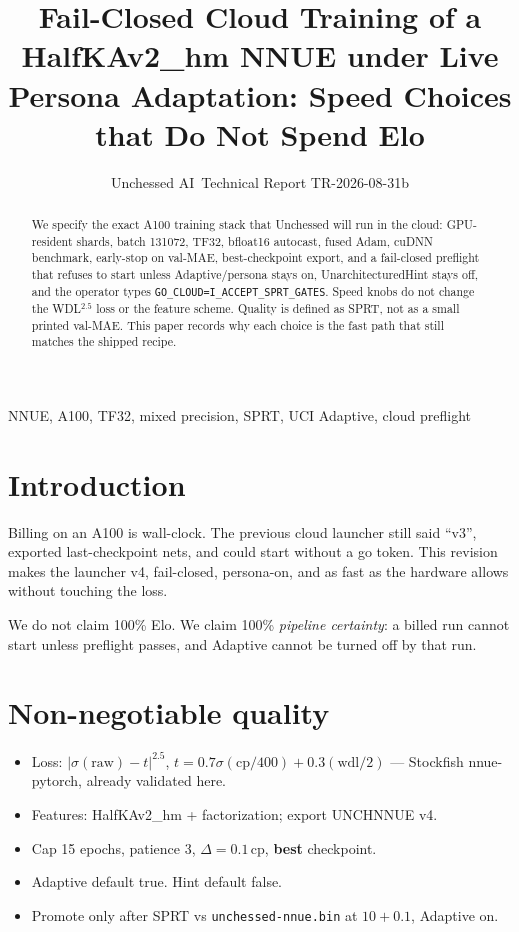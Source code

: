 \documentclass[journal,twocolumn,10pt]{IEEEtran}
\title{Fail-Closed Cloud Training of a HalfKAv2\_hm NNUE under Live Persona Adaptation: Speed Choices that Do Not Spend Elo}
\author{Unchessed AI~Technical Report TR-2026-08-31b}
\begin{document}
\maketitle
\begin{abstract}
We specify the exact A100 training stack that Unchessed will run in the cloud: GPU-resident shards, batch 131072, TF32, bfloat16 autocast, fused Adam, cuDNN benchmark, early-stop on val-MAE, best-checkpoint export, and a fail-closed preflight that refuses to start unless Adaptive/persona stays on, UnarchitecturedHint stays off, and the operator types \texttt{GO\_CLOUD=I\_ACCEPT\_SPRT\_GATES}. Speed knobs do not change the WDL$^{2.5}$ loss or the feature scheme. Quality is defined as SPRT, not as a small printed val-MAE. This paper records why each choice is the fast path that still matches the shipped recipe.
\end{abstract}
\begin{IEEEkeywords}
NNUE, A100, TF32, mixed precision, SPRT, UCI Adaptive, cloud preflight
\end{IEEEkeywords}

\section{Introduction}
Billing on an A100 is wall-clock. The previous cloud launcher still said ``v3'', exported last-checkpoint nets, and could start without a go token. This revision makes the launcher v4, fail-closed, persona-on, and as fast as the hardware allows without touching the loss.

We do not claim 100\% Elo. We claim 100\% \emph{pipeline certainty}: a billed run cannot start unless preflight passes, and Adaptive cannot be turned off by that run.

\section{Non-negotiable quality}
\begin{itemize}
\item Loss: $|\sigma(\mathrm{raw})-t|^{2.5}$, $t=0.7\sigma(\mathrm{cp}/400)+0.3(\mathrm{wdl}/2)$ --- Stockfish nnue-pytorch, already validated here.
\item Features: HalfKAv2\_hm + factorization; export UNCHNNUE v4.
\item Cap 15 epochs, patience 3, $\Delta=0.1$\,cp, \textbf{best} checkpoint.
\item Adaptive default true. Hint default false.
\item Promote only after SPRT vs \texttt{unchessed-nnue.bin} at $10+0.1$, Adaptive on.
\end{itemize}
\end{document}
